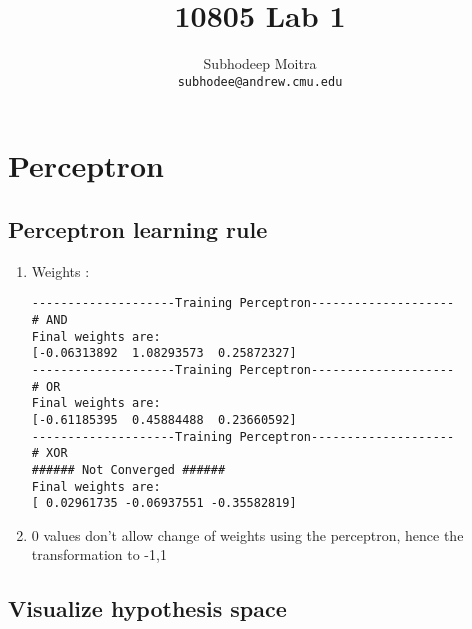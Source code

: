 \documentclass{article}
\begin{document}
\title{10805 Lab 1}
\author{Subhodeep Moitra \\ {\tt subhodee@andrew.cmu.edu}}
\date{}

\maketitle

\section{Perceptron}

\subsection{Perceptron learning rule}
\begin{enumerate}

\item Weights : 
\begin{verbatim}
--------------------Training Perceptron--------------------
# AND
Final weights are:
[-0.06313892  1.08293573  0.25872327]
--------------------Training Perceptron--------------------
# OR
Final weights are:
[-0.61185395  0.45884488  0.23660592]
--------------------Training Perceptron--------------------
# XOR
###### Not Converged ######
Final weights are:
[ 0.02961735 -0.06937551 -0.35582819]
\end{verbatim}

\item 0 values don't allow change of weights using the perceptron, hence the transformation to -1,1

\end{enumerate}

\subsection{Visualize hypothesis space}
\end{document}

